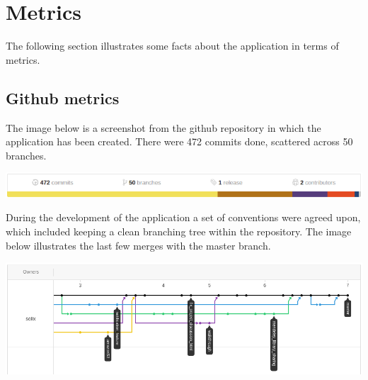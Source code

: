 \section{Metrics}

The following section illustrates some facts about the application in terms of metrics. 

\subsection{Github metrics}

The image below is a screenshot from the github repository in which the application has been created.
There were 472 commits done, scattered across 50 branches.

\begin{center}
\includegraphics[scale=0.5]{./img/github_stats.png}
\end{center}

During the development of the application a set of conventions were agreed upon, which included keeping a clean
branching tree within the repository. The image below illustrates the last few merges with the master branch.

\begin{center}
\includegraphics[scale=0.5]{./img/github_tree.png}
\end{center}